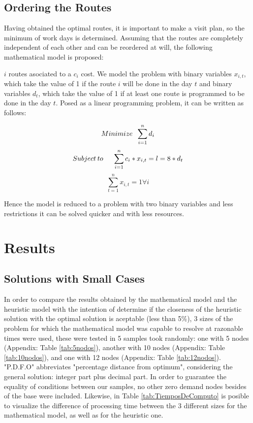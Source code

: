 \documentclass{amsart}
\begin{document}
        
        \subsection{Ordering the Routes}\label{OrderRoutes}
        Having obtained the optimal routes, it is important to make a visit plan, so the minimum of work days is determined. Assuming that the routes are completely independent of each other and can be reordered at will, the following mathematical model is proposed:
        
        $i$ routes asociated to a $c_i$ cost. We model the problem with binary variables
        $x_{i,t}$, which take the value of 1 if the route $i$ will be done in the day $t$ and binary variables $d_t$, which take the value of 1 if at least one route is programmed to be done in the day $t$.
        Posed as a linear programming problem, it can be written as follows:
        
        \begin{equation}
            Minimize \hspace{0.2cm} \sum^n_{i=1}d_i
        \end{equation}
        $$Subject\hspace{0.07cm} to \hspace{0.5cm} \sum^n_{i=1}c_i*x_{i,t} =l= 8 * d_t$$
        $$\sum^n_{t=1}x_{i,t}=1 \forall i$$
        
        Hence the model is reduced to a problem with two binary variables and less restrictions it can be solved quicker and with less resources.

    \section{Results}
        \subsection{Solutions with Small Cases}
        In order to compare the results obtained by the mathematical model and the heuristic model with the intention of determine if the closeness of the heuristic solution with the optimal solution is aceptable (less than 5\%), 3 sizes of the problem for which the mathematical model was capable to resolve at razonable times were used, these were tested in 5 samples took randomly: one with 5 nodes (Appendix: Table \ref{tab:5nodos}), another with 10 nodes (Appendix: Table \ref{tab:10nodos}), and one with 12 nodes (Appendix: Table \ref{tab:12nodos}). "P.D.F.O" abbreviates "percentage distance from optimum", considering the general solution: integer part plus decimal part. In order to guarantee the equality of conditions between our samples, no other zero demand nodes besides of the base were included. Likewise, in Table \ref{tab:TiemposDeComputo} is posible to visualize the difference of processing time between the 3 different sizes for the mathematical model, as well as for the heuristic one.
    
\end{document}
